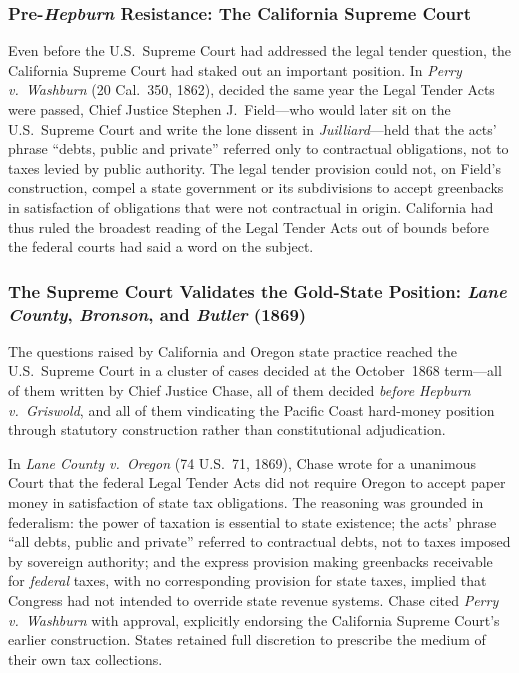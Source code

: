 \documentclass[12pt]{article}
\begin{document}
\subsubsection*{Pre-\textit{Hepburn} Resistance: The California
Supreme Court}

Even before the U.S.\ Supreme Court had addressed the legal tender question,
the California Supreme Court had staked out an important position.  In
\textit{Perry v.\ Washburn} (20 Cal.\ 350, 1862), decided the same year the
Legal Tender Acts were passed, Chief Justice Stephen J.\ Field---who would
later sit on the U.S.\ Supreme Court and write the lone dissent in
\textit{Juilliard}---held that the acts' phrase ``debts, public and private''
referred only to contractual obligations, not to taxes levied by public
authority.  The legal tender provision could not, on Field's construction,
compel a state government or its subdivisions to accept greenbacks in
satisfaction of obligations that were not contractual in origin.  California
had thus ruled the broadest reading of the Legal Tender Acts out of bounds
before the federal courts had said a word on the subject.

\subsubsection*{The Supreme Court Validates the Gold-State Position:
\textit{Lane County}, \textit{Bronson}, and \textit{Butler} (1869)}

The questions raised by California and Oregon state practice reached the
U.S.\ Supreme Court in a cluster of cases decided at the October~1868
term---all of them written by Chief Justice Chase, all of them decided
\textit{before} \textit{Hepburn v.\ Griswold}, and all of them vindicating
the Pacific Coast hard-money position through statutory construction rather
than constitutional adjudication.

In \textit{Lane County v.\ Oregon} (74 U.S.\ 71, 1869), Chase wrote for a
unanimous Court that the federal Legal Tender Acts did not require Oregon to
accept paper money in satisfaction of state tax obligations.  The reasoning
was grounded in federalism: the power of taxation is essential to state
existence; the acts' phrase ``all debts, public and private'' referred to
contractual debts, not to taxes imposed by sovereign authority; and the
express provision making greenbacks receivable for \textit{federal} taxes,
with no corresponding provision for state taxes, implied that Congress had
not intended to override state revenue systems.  Chase cited \textit{Perry
v.\ Washburn} with approval, explicitly endorsing the California Supreme
Court's earlier construction.  States retained full discretion to prescribe
the medium of their own tax collections.
\end{document}
